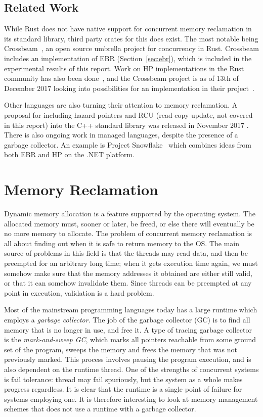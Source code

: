 \documentclass[b5paper]{report}
\begin{document}
\section{Related Work\label{sec:related-work}}

While Rust does not have native support for concurrent memory reclamation in its
standard library, third party crates for this does exist. The most notable being
Crossbeam~\cite{crossbeam}, an open source umbrella project for concurrency in
Rust. Crossbeam includes an implementation of EBR (Section~\ref{sec:ebr}), which
is included in the experimental results of this report. Work on HP
implementations in the Rust community has also been done~\cite{ticky:hp}, and
the Crossbeam project is as of 13th of December 2017 looking into possibilities
for an implementation in their project~\cite{crossbeam-hp}.

Other languages are also turning their attention to memory reclamation. A
proposal for including hazard pointers and RCU (read-copy-update, not covered in
this report) into the C++ standard library was released in November 2017
\cite{cpp:mr}. There is also ongoing work in managed languages, despite the
presence of a garbage collector. An example is Project
Snowflake~\cite{project-snowflake-non-blocking-safe-manual-memory-management-net}
which combines ideas from both EBR and HP on the .NET platform.



\chapter{Memory Reclamation\label{ch:memory-reclamation}}

Dynamic memory allocation is a feature supported by the operating system. The
allocated memory must, sooner or later, be freed, or else there will
eventually be no more memory to allocate. The problem of concurrent memory
reclamation is all about finding out when it is safe to return memory to the
OS\@. The main source of problems in this field is that the threads may read
data, and then be preempted for an arbitrary long time; when it gets execution
time again, we must somehow make sure that the memory addresses it obtained are
either still valid, or that it can somehow invalidate them. Since threads can be
preempted at any point in execution, validation is a hard problem.

Most of the mainstream programming languages today has a large runtime which
employs a \emph{garbage collector}. The job of the garbage collector (GC) is to
find all memory that is no longer in use, and free it. A type of tracing garbage
collector is the \emph{mark-and-sweep GC}, which marks all pointers reachable
from some ground set of the program, sweeps the memory and frees the memory that
was not previously marked. This process involves pausing the program execution,
and is also dependent on the runtime thread.  One of the strengths of concurrent
systems is fail tolerance: thread may fail spuriously, but the system as a whole
makes progress regardless. It is clear that the runtime is a single point of
failure for systems employing one. It is therefore interesting to look at memory
management schemes that does not use a runtime with a garbage collector.
\end{document}
